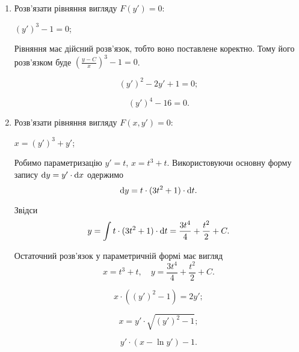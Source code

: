 \begin{enumerate}
	\item Розв'язати рівняння вигляду $F(y') = 0$:
	\begin{example}
		$(y')^3 - 1 = 0$;
	\end{example}
	
	\begin{solution}
		Рівняння має дійсний розв'язок, тобто воно поставлене коректно. Тому його розв'язком буде $\left(\frac{y - C}{x}\right)^3 - 1 = 0$.	
	\end{solution}
	
	\begin{multicols}{2}
		\begin{problem}
			\[(y')^2 - 2 y' + 1 = 0;\]
		\end{problem}
		
		\begin{problem}
			\[ (y')^4 - 16 = 0. \]
		\end{problem}
	\end{multicols}

	\item Розв'язати рівняння вигляду $F(x, y') = 0$:
	\begin{example}
		$x = (y')^3 + y'$;
	\end{example}
	
	\begin{solution}
		Робимо параметризацію $y' = t$, $x = t^3 + t$. Використовуючи основну форму запису $\mathop{}\!\mathrm{d} y = y' \cdot \mathop{}\!\mathrm{d} x$ одержимо \[ \mathop{}\!\mathrm{d} y = t \cdot (3t^2 + 1) \cdot \mathop{}\!\mathrm{d} t.\]
	
		Звідси \[ y = \int t \cdot (3t^2 + 1) \cdot \mathop{}\!\mathrm{d} t = \frac{3t^4}{4} + \frac{t^2}{2} + C.\]
	
		Остаточний розв'язок у параметричній формі має вигляд\[ x = t^3 + t, \quad y = \frac{3t^4}{4} + \frac{t^2}{2} + C.\]
	\end{solution}

	\begin{multicols}{2}
		\begin{problem}
			\[ x \cdot ((y')^2 - 1) = 2y'; \]
		\end{problem}
		
		\begin{problem}
			\[ x = y' \cdot \sqrt{(y')^2 - 1}; \]
		\end{problem}
		
		\begin{problem}
		 	\[ y' \cdot (x - \ln y') - 1. \]
		\end{problem}
	\end{multicols}


\end{enumerate}
